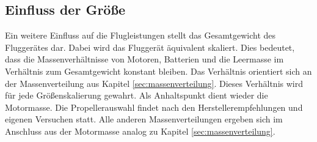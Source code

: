\subsection{Einfluss der Größe}
\label{subsec:groesse}
Ein weitere Einfluss auf die Flugleistungen stellt das Gesamtgewicht des Fluggerätes dar. Dabei wird das Fluggerät äquivalent skaliert. Dies bedeutet, dass die Massenverhältnisse von Motoren, Batterien und die Leermasse im Verhältnis zum Gesamtgewicht konstant bleiben. Das Verhältnis orientiert sich an der Massenverteilung aus Kapitel \ref{sec:massenverteilung}. Dieses Verhältnis wird für jede Größenskalierung gewahrt. Als Anhaltspunkt dient wieder die Motormasse. Die Propellerauswahl findet nach den Herstellerempfehlungen und eigenen Versuchen statt. Alle anderen Massenverteilungen ergeben sich im Anschluss aus der Motormasse analog zu Kapitel \ref{sec:massenverteilung}.

